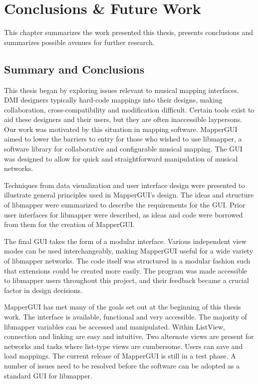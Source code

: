 \chapter{Conclusions \& Future Work}

This chapter summarizes the work presented this thesis, presents conclusions and summarizes possible avenues for further research.

\section{Summary and Conclusions}

This thesis began by exploring issues relevant to musical mapping interfaces. DMI designers typically hard-code mappings into their designs, making collaboration, cross-compatibility and modification difficult. Certain tools exist to aid these designers and their users, but they are often inaccessible laypersons. Our work was motivated by this situation in mapping software. MapperGUI aimed to lower the barriers to entry for those who wished to use libmapper, a software library for collaborative and configurable musical mapping. The GUI was designed to allow for quick and straightforward manipulation of musical networks. 

Techniques from data visualization and user interface design were presented to illustrate general principles used in MapperGUI's design. The ideas and structure of libmapper were summarized to describe the requirements for the GUI. Prior user interfaces for libmapper were described, as ideas and code were borrowed from them for the creation of MapperGUI.

The final GUI takes the form of a modular interface. Various independent view modes can be used interchangeably, making MapperGUI useful for a wide variety of libmapper networks. The code itself was structured in a modular fashion such that extensions could be created more easily. The program was made accessible to libmapper users throughout this project, and their feedback became a crucial factor in design decisions. 

MapperGUI has met many of the goals set out at the beginning of this thesis work. The interface is available, functional and very accessible. The majority of libmapper variables can be accessed and manipulated. Within ListView, connection and linking are easy and intuitive. Two alternate views are present for networks and tasks where list-type views are cumbersome. Users can save and load mappings. The current release of MapperGUI is still in a test phase. A number of issues need to be resolved before the software can be adopted as a standard GUI for libmapper. 


